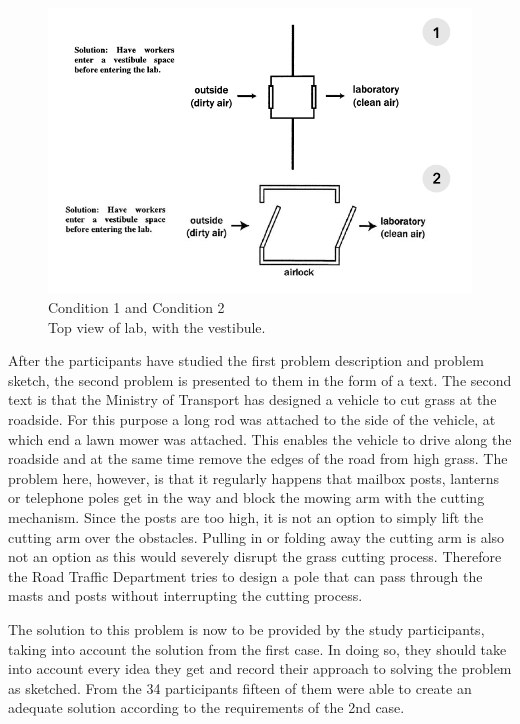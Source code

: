 \documentclass[12pt]{article}
\begin{document}
\begin{figure}[H]
  \centering
  \includegraphics[width=0.7\linewidth]{images/input_conditons.PNG}
  \caption{\label{fig:input_conditions} Condition 1 and Condition 2 \\ Top view of lab, with the vestibule. \protect\cite[pp. 205-207]{davies2009computational}}
\end{figure}     
%
After the participants have studied the first problem description and problem sketch, the second problem is presented to them in the form of a text. 
The second text is that the Ministry of Transport has designed a vehicle to cut grass at the roadside. For this purpose a long rod was attached to the side of the vehicle, at which end a lawn mower was attached. This enables the vehicle to drive along the roadside and at the same time remove the edges of the road from high grass. The problem here, however, is that it regularly happens that mailbox posts, lanterns or telephone poles get in the way and block the mowing arm with the cutting mechanism. Since the posts are too high, it is not an option to simply lift the cutting arm over the obstacles. Pulling in or folding away the cutting arm is also not an option as this would severely disrupt the grass cutting process. Therefore the Road Traffic Department tries to design a pole that can pass through the masts and posts without interrupting the cutting process. 

The solution to this problem is now to be provided by the study participants, taking into account the solution from the first case. In doing so, they should take into account every idea they get and record their approach to solving the problem as sketched.  From the 34 participants fifteen of them were able to create an adequate solution according to the requirements of the 2nd case. 
\end{document}
